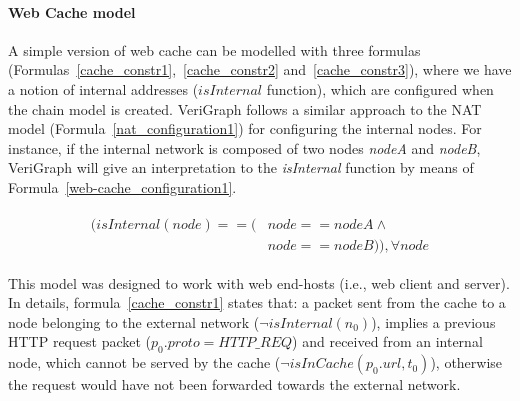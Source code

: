 \paragraph{Web Cache model} A simple version of web cache can be modelled with three formulas (Formulas~\ref{cache_constr1},~\ref{cache_constr2} and~\ref{cache_constr3}), where we have a notion of internal addresses (\textit{$isInternal$} function), which are configured when the chain model is created. VeriGraph follows a similar approach to the NAT model (Formula~\ref{nat_configuration1}) for configuring the internal nodes. For instance, if the internal network is composed of two nodes \textit{nodeA} and \textit{nodeB}, VeriGraph will give an interpretation to the \textit{isInternal} function by means of Formula~\ref{web-cache_configuration1}.
\begin{figure}[h]
	{\footnotesize
		\begin{subequations}
			\begin{align}
				\begin{split}
					\label{web-cache_configuration1}
					(isInternal(node) == (& node == nodeA \wedge \\
					& node == nodeB)), \forall node
				\end{split}
			\end{align}
		\end{subequations}
	}%
\end{figure}

This model was designed to work with web end-hosts (i.e., web client and server). In details, formula~\ref{cache_constr1} states that: a packet sent from the cache to a node belonging to the external network (\textit{$\neg isInternal(n_{0})$}), implies a previous HTTP request packet (\textit{$p_{0}.proto = HTTP\_REQ$}) and received from an internal node, which cannot be served by the cache (\textit{$\neg isInCache(p_{0}.url, t_{0})$}), otherwise the request would have not been forwarded towards the external network. 

